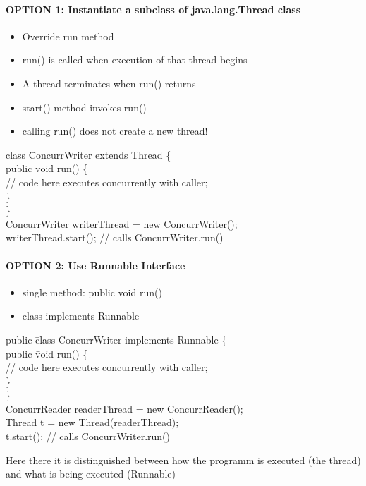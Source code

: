 \documentclass[8pt]{extreport}
\begin{document}
\paragraph{OPTION 1: Instantiate a subclass of java.lang.Thread class}
\begin{itemize}
\item Override run method
\item run() is called when execution of that thread begins
\item A thread terminates when run() returns
\item start() method invokes run()
\item calling run() does not create a new thread!
\end{itemize}
\begin{snugshade*}
\begin{tabbing}
class \= ConcurrWriter extends Thread \{ \\
\> public \= void run() \{\\
\> \>  // code here executes concurrently with caller;\\
\> \} \\
\} \\
ConcurrWriter writerThread = new ConcurrWriter();\\
writerThread.start(); // calls ConcurrWriter.run()
\end{tabbing}
\end{snugshade*}

\paragraph{OPTION 2: Use Runnable Interface}
\begin{itemize}
\item single method: public void run()
\item class implements Runnable
\end{itemize}
\begin{snugshade*}
\begin{tabbing}
public \=class ConcurrWriter implements Runnable \{ \\
\> public \= void run() \{\\
\> \>  // code here executes concurrently with caller;\\
\> \} \\
\} \\
ConcurrReader readerThread = new ConcurrReader();\\
Thread t = new Thread(readerThread);\\
t.start(); // calls ConcurrWriter.run()
\end{tabbing}
\end{snugshade*}
Here there it is distinguished between how the programm is executed (the thread) and what is being executed (Runnable)
\end{document}

